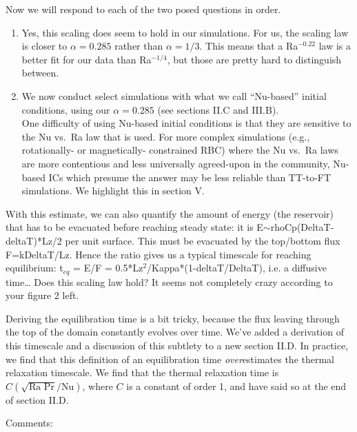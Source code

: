 \documentclass[aps, 11pt, singlecolumn]{revtex4-1} %
\begin{document}
\begin{singlespace}
Now we will respond to each of the two posed questions in order.
\begin{enumerate}
\item 
Yes, this scaling does seem to hold in our simulations.
For us, the scaling law is closer to $\alpha = 0.285$ rather than $\alpha = 1/3$.
This means that a Ra$^{-0.22}$ law is a better fit for our data than Ra$^{-1/4}$, but those are pretty hard to distinguish between.
\item 
We now conduct select simulations with what we call ``Nu-based'' initial conditions, using our $\alpha = 0.285$ (see sections II.C and III.B).
\vspace{0.5cm}
\\
One difficulty of using Nu-based initial conditions is that they are sensitive to the Nu vs.~Ra law that is used.
For more complex simulations (e.g., rotationally- or magnetically- constrained RBC) where the Nu vs.~Ra laws are more contentious and less universally agreed-upon in the community, Nu-based ICs which presume the answer may be less reliable than TT-to-FT simulations.
We highlight this in section V.
\end{enumerate}


\begin{myquotation}
With this estimate, we can also quantify the amount of energy (the reservoir) that has to be evacuated before reaching steady state: it is E$\sim$rhoCp(DeltaT-deltaT)*Lz/2 per unit surface. 
This must be evacuated by the top/bottom flux F=kDeltaT/Lz. 
Hence the ratio gives us a typical timescale for reaching equilibrium: t$_{eq}$ = E/F = 0.5*Lz$^2$/Kappa*(1-deltaT/DeltaT), i.e. a diffusive time…
Does this scaling law hold? It seems not completely crazy according to your figure 2 left.
\end{myquotation}
Deriving the equilibration time is a bit tricky, because the flux leaving through the top of the domain constantly evolves over time.
We've added a derivation of this timescale and a discussion of this subtlety to a new section II.D.
In practice, we find that this definition of an equilibration time \emph{over}estimates the thermal relaxation timescale.
We find that the thermal relaxation time is $C (\sqrt{\text{Ra Pr}}/\text{Nu})$, where $C$ is a constant of order 1, and have said so at the end of section II.D.

\begin{myquotation}
Comments:


\end{myquotation}
\end{singlespace}
\end{document}
